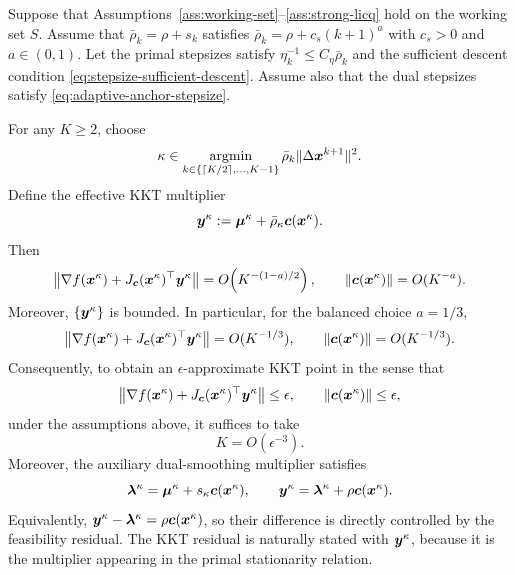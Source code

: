 \documentclass[10pt]{article}
\begin{document}
\begin{theorem}
\label{theorem:target-complexity}
Suppose that Assumptions~\ref{ass:working-set}--\ref{ass:strong-licq} hold
on the working set $S$.  Assume that $\bar\rho_k=\rho+s_k$ satisfies
$\bar\rho_k=\rho+c_s(k+1)^a$ with $c_s>0$ and $a\in(0,1)$.  Let the primal
stepsizes satisfy $\eta_k^{-1}\le C_\eta\bar\rho_k$ and the sufficient
descent condition \eqref{eq:stepsize-sufficient-descent}.  Assume also that
the dual stepsizes satisfy \eqref{eq:adaptive-anchor-stepsize}.

For any $K\ge2$, choose
\[
    \kappa
    \in
    \operatorname*{\mathrm{argmin}}_{k\in\{\lceil K/2\rceil,\ldots,K-1\}}
    \bar\rho_k\|\Delta\bm{x}^{k+1}\|^2.
\]
Define the effective KKT multiplier
\[
    \bm{y}^\kappa
    :=
    \bm{\mu}^\kappa+\bar\rho_\kappa\bm{c}(\bm{x}^\kappa).
\]
Then
\begin{equation}\label{eq:kkt-residual-general-a}
    \left\|
    \nabla f(\bm{x}^\kappa)
    +
    J_{\bm{c}}(\bm{x}^\kappa)^\top \bm{y}^\kappa
    \right\|
    =
    O\!\left(K^{-(1-a)/2}\right),
    \qquad
    \|\bm{c}(\bm{x}^\kappa)\|
    =
    O(K^{-a}).
\end{equation}
Moreover, $\{\bm{y}^\kappa\}$ is bounded.  In particular, for the balanced
choice $a=1/3$,
\[
    \left\|
    \nabla f(\bm{x}^\kappa)
    +
    J_{\bm{c}}(\bm{x}^\kappa)^\top \bm{y}^\kappa
    \right\|
    =
    O(K^{-1/3}),
    \qquad
    \|\bm{c}(\bm{x}^\kappa)\|
    =
    O(K^{-1/3}).
\]
Consequently, to obtain an $\epsilon$-approximate KKT point in the sense that
\[
    \left\|
    \nabla f(\bm{x}^\kappa)
    +
    J_{\bm{c}}(\bm{x}^\kappa)^\top \bm{y}^\kappa
    \right\|
    \le
    \epsilon,
    \qquad
    \|\bm{c}(\bm{x}^\kappa)\|
    \le
    \epsilon,
\]
under the assumptions above, it suffices to take
\[
    K
    =
    O(\epsilon^{-3}).
\]
Moreover, the auxiliary dual-smoothing multiplier satisfies
\[
    \bm{\lambda}^\kappa
    =
    \bm{\mu}^\kappa+s_\kappa\bm{c}(\bm{x}^\kappa),
    \qquad
    \bm{y}^\kappa
    =
    \bm{\lambda}^\kappa+\rho\bm{c}(\bm{x}^\kappa).
\]
Equivalently, $\bm{y}^\kappa-\bm{\lambda}^\kappa=\rho\bm{c}(\bm{x}^\kappa)$, so their
difference is directly controlled by the feasibility residual.  The KKT
residual is naturally stated with $\bm{y}^\kappa$, because it is the multiplier
appearing in the primal stationarity relation.
\end{theorem}
\end{document}
